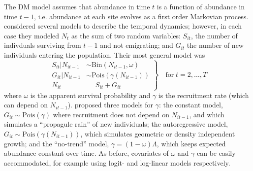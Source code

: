 \documentclass[12pt]{article}
\begin{document}
The DM model assumes that abundance in time $t$ is a function of
abundance in time $t-1$, i.e. abundance at each site evolves as a
first order Markovian process. %
\citet{dail_madsen:2011} considered several models to describe the temporal dynamics;
however, in each case they modeled $N_t$ as the sum of two random variables:
$S_{it}$, the number of indivduals surviving from $t-1$ and not
emigrating; and $G_{it}$ the number of new individuals entering
the population. Their most general model was
\begin{equation}
\left.\begin{aligned}
S_{it}|N_{it-1} &\sim \mathrm{Bin}(N_{it-1}, \omega) \\
G_{it}|N_{it-1} &\sim \mathrm{Pois}(\gamma(N_{it-1})) \\
N_{it} &= S_{it}+G_{it}
\end{aligned}\right\} \quad \text{for} \; t=2,\hdots,T
\label{eq:Nt}
\end{equation}
where $\omega$ is the apparent survival probability and $\gamma$
is the recruitment rate (which can depend on $N_{it-1}$).
\citet{dail_madsen:2011} proposed three
models for $\gamma$: the constant model,
$G_{it} \sim \mathrm{Pois}(\gamma)$ where recruitment does not
depend on $N_{it-1}$, and which simulates a ``propagule rain'' of new
individuals; the autoregressive model, $G_{it} \sim
\mathrm{Pois}(\gamma(N_{it-1}))$, which
simulates geometric or density independent growth; and the
``no-trend'' model, $\gamma = (1-\omega)\Lambda$, which keeps
expected abundance constant over time. As before, covariates of
$\omega$ and $\gamma$ can be easily accommodated, for example
using logit- and log-linear models respectively.

%
\end{document}
